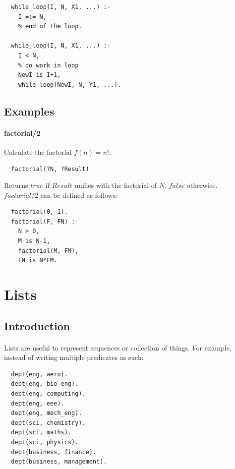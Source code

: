 \documentclass{article}
\begin{document}
\begin{multicols}{2}
  \begin{lstlisting}
  while_loop(I, N, X1, ...) :-
    I =:= N,
    % end of the loop.
  
  while_loop(I, N, X1, ...) :-
    I < N,
    % do work in loop
    NewI is I+1,
    while_loop(NewI, N, Y1, ...).
  \end{lstlisting}
  
  \subsection{Examples}  
  
  \paragraph{factorial/2} Calculate the factorial $f(n) = n!$:
  
  \begin{lstlisting}
  factorial(?N, ?Result)
  \end{lstlisting} 
  
  Returns $true$ if $Result$ unifies with the factorial of $N$, $false$ otherwise. $factorial/2$ can be defined as follows:
  
  \begin{lstlisting}
  factorial(0, 1).
  factorial(F, FN) :-
    N > 0,
    M is N-1,
    factorial(M, FM),
    FN is N*FM.
  \end{lstlisting}
  
  \section{Lists}  
  
  \subsection{Introduction}
  
  \paragraph{} Lists are useful to represent sequences or collection of things. For example, instead of writing multiple predicates as such:
  
  \begin{lstlisting}
  dept(eng, aero).
  dept(eng, bio_eng).
  dept(eng, computing).
  dept(eng, eee).
  dept(eng, mech_eng).
  dept(sci, chemistry).
  dept(sci, maths).
  dept(sci, physics).
  dept(business, finance).
  dept(business, management).
  \end{lstlisting}
  

\end{multicols}
\end{document}
